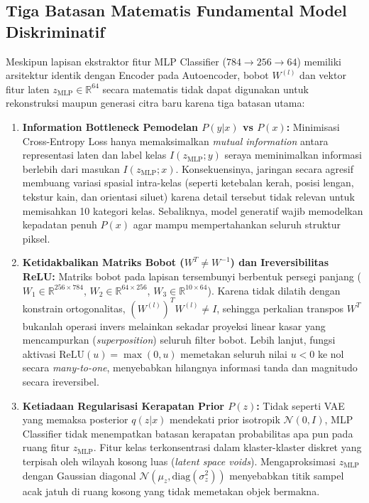 \documentclass[11pt,a4paper]{article}
\begin{document}
\subsection{Tiga Batasan Matematis Fundamental Model Diskriminatif}
Meskipun lapisan ekstraktor fitur MLP Classifier ($784 \rightarrow 256 \rightarrow 64$) memiliki arsitektur identik dengan Encoder pada Autoencoder, bobot $W^{(l)}$ dan vektor fitur laten $z_{\text{MLP}} \in \mathbb{R}^{64}$ secara matematis tidak dapat digunakan untuk rekonstruksi maupun generasi citra baru karena tiga batasan utama:

\begin{enumerate}[leftmargin=1.4em, itemsep=3pt]
  \item \textbf{Information Bottleneck Pemodelan $P(y|x)$ vs $P(x)$:} Minimisasi Cross-Entropy Loss hanya memaksimalkan \textit{mutual information} antara representasi laten dan label kelas $I(z_{\text{MLP}}; y)$ seraya meminimalkan informasi berlebih dari masukan $I(z_{\text{MLP}}; x)$. Konsekuensinya, jaringan secara agresif membuang variasi spasial intra-kelas (seperti ketebalan kerah, posisi lengan, tekstur kain, dan orientasi siluet) karena detail tersebut tidak relevan untuk memisahkan 10 kategori kelas. Sebaliknya, model generatif wajib memodelkan kepadatan penuh $P(x)$ agar mampu mempertahankan seluruh struktur piksel.

  \item \textbf{Ketidakbalikan Matriks Bobot ($W^T \neq W^{-1}$) dan Ireversibilitas ReLU:} Matriks bobot pada lapisan tersembunyi berbentuk persegi panjang ($W_1 \in \mathbb{R}^{256 \times 784}$, $W_2 \in \mathbb{R}^{64 \times 256}$, $W_3 \in \mathbb{R}^{10 \times 64}$). Karena tidak dilatih dengan konstrain ortogonalitas, $(W^{(l)})^T W^{(l)} \neq I$, sehingga perkalian transpos $W^T$ bukanlah operasi invers melainkan sekadar proyeksi linear kasar yang mencampurkan (\textit{superposition}) seluruh filter bobot. Lebih lanjut, fungsi aktivasi $\text{ReLU}(u) = \max(0, u)$ memetakan seluruh nilai $u < 0$ ke nol secara \textit{many-to-one}, menyebabkan hilangnya informasi tanda dan magnitudo secara ireversibel.

  \item \textbf{Ketiadaan Regularisasi Kerapatan Prior $P(z)$:} Tidak seperti VAE yang memaksa posterior $q(z|x)$ mendekati prior isotropik $\mathcal{N}(0, I)$, MLP Classifier tidak menempatkan batasan kerapatan probabilitas apa pun pada ruang fitur $z_{\text{MLP}}$. Fitur kelas terkonsentrasi dalam klaster-klaster diskret yang terpisah oleh wilayah kosong luas (\textit{latent space voids}). Mengaproksimasi $z_{\text{MLP}}$ dengan Gaussian diagonal $\mathcal{N}(\mu_z, \text{diag}(\sigma_z^2))$ menyebabkan titik sampel acak jatuh di ruang kosong yang tidak memetakan objek bermakna.
\end{enumerate}
\end{document}
